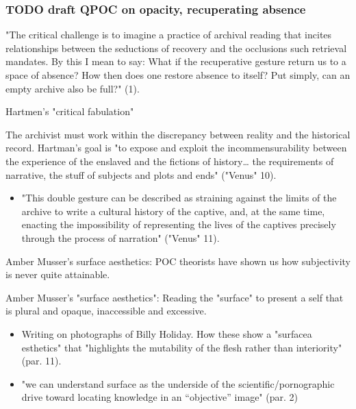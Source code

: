 \documentclass[11pt]{article}
\begin{document}
\subsubsection{{\bfseries\sffamily TODO} draft QPOC on opacity, recuperating absence}
\label{sec:org9bb62ae}

"The critical challenge is to imagine a practice of archival reading
that incites relationships between the seductions of recovery and the
occlusions such retrieval mandates. By this I mean to say: What if the
recuperative gesture return us to a space of absence? How then does
one restore absence to itself? Put simply, can an empty archive also
be full?" (1). 

Hartmen's "critical fabulation"

The archivist must work within the discrepancy between reality and the
historical record. Hartman's goal is "to expose and exploit the
incommensurability between the experience of the enslaved and the
fictions of history\ldots{} the requirements of narrative, the stuff of
subjects and plots and ends" ("Venus" 10).
\begin{itemize}
\item "This double gesture can be described as straining against the
limits of the archive to write a cultural history of the captive,
and, at the same time, enacting the impossibility of representing
the lives of the captives precisely through the process of
narration" ("Venus" 11).
\end{itemize}

Amber Musser's surface aesthetics: POC theorists have shown us how
subjectivity is never quite attainable.

Amber Musser's "surface aesthetics": Reading the "surface" to present
a self that is plural and opaque, inaccessible and excessive.
\begin{itemize}
\item Writing on photographs of Billy Holiday. How these show a
"surfacea esthetics" that "highlights the mutability of the flesh
rather than interiority" (par. 11).
\item "we can understand surface as the underside of the
scientific/pornographic drive toward locating knowledge in an
“objective” image" (par. 2)
\end{itemize}
\end{document}
